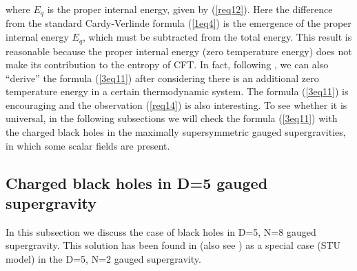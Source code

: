 \documentclass[a4paper,12pt]{article}
\begin{document}
where $E_q$ is the proper internal energy, given by (\ref{req12}). 
Here the difference from the standard Cardy-Verlinde formula (\ref{1eq4}) 
is the emergence of the proper internal energy $E_q$, which must be subtracted 
from the total energy. This result is  reasonable because the proper internal
energy (zero temperature energy) does not make its contribution to the entropy
of CFT.  In fact, following \cite{Verl}, we can also ``derive'' the formula 
(\ref{3eq11}) after considering there is an additional zero temperature 
energy in a certain thermodynamic system. The formula (\ref{3eq11}) is 
encouraging and the 
observation (\ref{req14})
is also interesting.  To see whether it is universal, in the following 
subsections we will check the formula (\ref{3eq11}) with the charged black 
holes in the maximally supersymmetric gauged supergravities, in which some 
scalar fields are present.






\subsection{Charged black holes in D=5 gauged supergravity}

In this subsection we discuss the case of black holes in D=5, N=8 gauged
supergravity. This solution has been found in \cite{Behr} (also see  
\cite{Cvetic}) as a special case (STU model) in the D=5, N=2 gauged 
supergravity.
\end{document}
